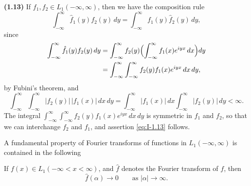 \noindent\textbf{(1.13)} If $f_1,f_2\in L_1(-\infty,\infty)$, then we have the composition rule
\begin{equation}\label{eq:I-1.13}
\int_{-\infty}^{\infty}\hat f_1(y)f_2(y)\,dy
=\int_{-\infty}^{\infty}f_1(y)\hat f_2(y)\,dy,
\end{equation}
since
\begin{align*}
\int_{-\infty}^{\infty}\hat f_1(y)f_2(y)\,dy
&=\int_{-\infty}^{\infty}f_2(y)\Bigl(\int_{-\infty}^{\infty}f_1(x)e^{iyx}\,dx\Bigr)dy\\
&=\int_{-\infty}^{\infty}\int_{-\infty}^{\infty}f_2(y)f_1(x)e^{iyx}\,dx\,dy,
\end{align*}
by Fubini's theorem, and
\begin{equation*}
\int_{-\infty}^{\infty}\int_{-\infty}^{\infty}|f_2(y)|\,|f_1(x)|\,dx\,dy
=\int_{-\infty}^{\infty}|f_1(x)|\,dx\int_{-\infty}^{\infty}|f_2(y)|\,dy<\infty.
\end{equation*}
The integral $\int_{-\infty}^{\infty}\int_{-\infty}^{\infty}f_2(y)f_1(x)e^{iyx}\,dx\,dy$ is symmetric in $f_1$ and $f_2$, so that we can interchange $f_2$ and $f_1$, and assertion \eqref{eq:I-1.13} follows.

A fundamental property of Fourier transforms of functions in $L_1(-\infty,\infty)$ is contained in the following

\begin{theorem}\label{thm:I-1}
If $f(x)\in L_1(-\infty<x<\infty)$, and $\hat f$ denotes the Fourier transform of $f$, then
\begin{equation*}
\widehat f(\alpha)\to 0\qquad\text{as }|\alpha|\to\infty.
\end{equation*}
\end{theorem}


